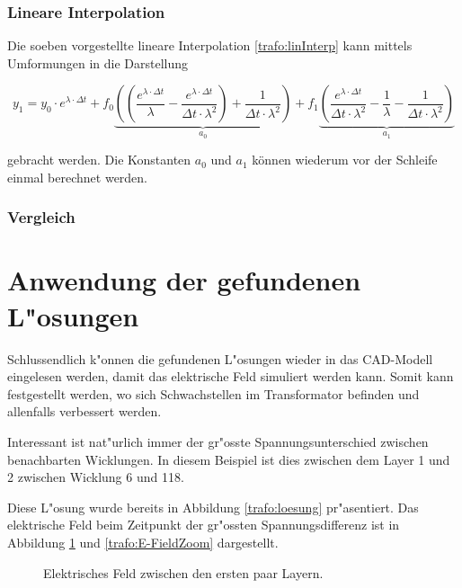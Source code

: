 \begin{refsection}
\subsubsection{Lineare Interpolation}
Die soeben vorgestellte lineare Interpolation \ref{trafo:linInterp} kann mittels Umformungen in die Darstellung 

\begin{equation*}
	y_1 = y_0 \cdot e^{\lambda \cdot \Delta t} + f_0 \underbrace{\left(\left(\frac{e^{\lambda \cdot \Delta t}}{\lambda} - \frac{e^{\lambda \cdot \Delta t}}{\Delta t \cdot \lambda ^2}\right) + \frac{1}{\Delta t \cdot \lambda^2}\right)}_{a_0} + f_1 \underbrace{\left(\frac{e^{\lambda \cdot \Delta t}}{\Delta t \cdot \lambda^2} - \frac{1}{\lambda} - \frac{1}{\Delta t \cdot \lambda^2}\right)}_{a_1}
\end{equation*} 

gebracht werden. Die Konstanten $a_0$ und $a_1$ können wiederum vor der Schleife einmal berechnet werden. 

\subsubsection{Vergleich}



\section{Anwendung der gefundenen L"osungen}

Schlussendlich k"onnen die gefundenen L"osungen wieder in das CAD-Modell eingelesen werden, damit das elektrische Feld simuliert werden kann. Somit kann festgestellt werden, wo sich Schwachstellen im Transformator befinden und allenfalls verbessert werden.

Interessant ist nat"urlich immer der gr"osste Spannungsunterschied zwischen benachbarten Wicklungen. In diesem Beispiel ist dies zwischen dem Layer 1 und 2 zwischen Wicklung 6 und 118.

Diese L"osung wurde bereits in Abbildung \ref{trafo:loesung} pr"asentiert. Das elektrische Feld beim Zeitpunkt der gr"ossten Spannungsdifferenz ist in Abbildung \ref{trafo:E-Field} und \ref{trafo:E-FieldZoom} dargestellt. 

\begin{figure}
	\centering
	\caption{Elektrisches Feld zwischen den ersten paar Layern.}
	\label{trafo:E-Field}
\end{figure}


\end{refsection}
